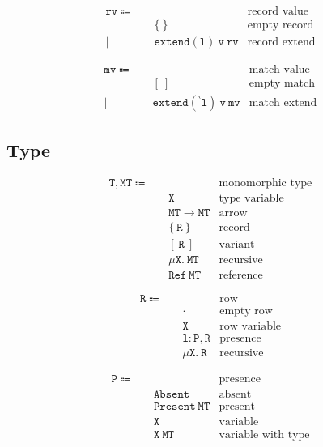 \documentclass{report}
\newcommand{\code}{\mathtt}
\newcommand{\backtick}{{}^{\backprime}}
\begin{document}
\begin{align*}
\code{rv} \Coloneqq \quad & & \text{record value} \\
& \code{\{\ \}} & \text{empty record} \\
| \quad & \code{extend(l)\ v\ rv} & \text{record extend}
\end{align*}

\begin{align*}
\code{mv} \Coloneqq \quad & & \text{match value} \\
& \code{[\ ]} & \text{empty match} \\
| \quad & \code{extend(\backtick l)\ v\ mv} & \text{match extend}
\end{align*}

\subsection{Type}

\begin{align*}
\code{T, MT} \Coloneqq \quad & & \text{monomorphic type} \\
& \code{X} & \text{type variable} \\
& \code{MT \rightarrow MT} & \text{arrow} \\
& \code{\{\ R\ \}} & \text{record} \\
& \code{[\ R\ ]} & \text{variant} \\
& \code{\mu X.\ MT} & \text{recursive} \\
& \code{Ref\ MT} & \text{reference}
\end{align*}

\begin{align*}
\code{R} \Coloneqq \quad & & \text{row} \\
& \code{\cdot} & \text{empty row} \\
& \code{X} & \text{row variable} \\
& \code{l : P, R} & \text{presence} \\
& \code{\mu X.\ R} & \text{recursive}
\end{align*}

\begin{align*}
\code{P} \Coloneqq \quad & & \text{presence} \\
& \code{Absent} & \text{absent} \\
& \code{Present\ MT} & \text{present} \\
& \code{X} & \text{variable} \\
& \code{X\ MT} & \text{variable with type}
\end{align*}
\end{document}
